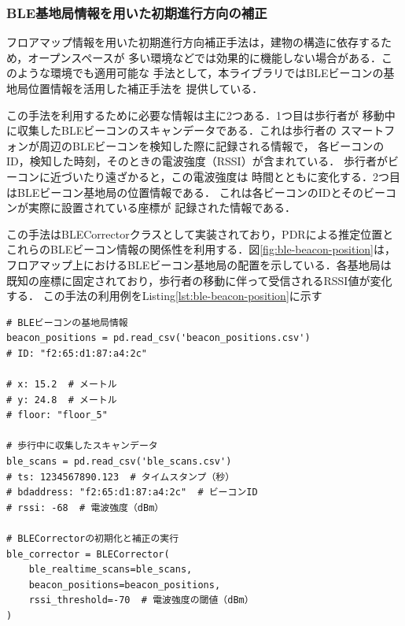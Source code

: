 
\subsubsection{BLE基地局情報を用いた初期進行方向の補正}

フロアマップ情報を用いた初期進行方向補正手法は，建物の構造に依存するため，オープンスペースが
多い環境などでは効果的に機能しない場合がある．このような環境でも適用可能な
手法として，本ライブラリではBLEビーコンの基地局位置情報を活用した補正手法を
提供している．

この手法を利用するために必要な情報は主に2つある．1つ目は歩行者が
移動中に収集したBLEビーコンのスキャンデータである．これは歩行者の
スマートフォンが周辺のBLEビーコンを検知した際に記録される情報で，
各ビーコンのID，検知した時刻，そのときの電波強度（RSSI）が含まれている．
歩行者がビーコンに近づいたり遠ざかると，この電波強度は
時間とともに変化する．2つ目はBLEビーコン基地局の位置情報である．
これは各ビーコンのIDとそのビーコンが実際に設置されている座標が
記録された情報である．

この手法はBLECorrectorクラスとして実装されており，PDRによる推定位置と
これらのBLEビーコン情報の関係性を利用する．図\ref{fig:ble-beacon-position}は，
フロアマップ上におけるBLEビーコン基地局の配置を示している．各基地局は
既知の座標に固定されており，歩行者の移動に伴って受信されるRSSI値が変化する．
この手法の利用例をListing\ref{lst:ble-beacon-position}に示す

\begin{lstlisting}[caption={BLECorrectorの使用例},label=lst:ble-beacon-position,float=h]
# BLEビーコンの基地局情報
beacon_positions = pd.read_csv('beacon_positions.csv')
# ID: "f2:65:d1:87:a4:2c"

# x: 15.2  # メートル
# y: 24.8  # メートル
# floor: "floor_5"

# 歩行中に収集したスキャンデータ
ble_scans = pd.read_csv('ble_scans.csv')
# ts: 1234567890.123  # タイムスタンプ（秒）
# bdaddress: "f2:65:d1:87:a4:2c"  # ビーコンID
# rssi: -68  # 電波強度（dBm）

# BLECorrectorの初期化と補正の実行
ble_corrector = BLECorrector(
    ble_realtime_scans=ble_scans,
    beacon_positions=beacon_positions,
    rssi_threshold=-70  # 電波強度の閾値（dBm）
)
\end{lstlisting}



